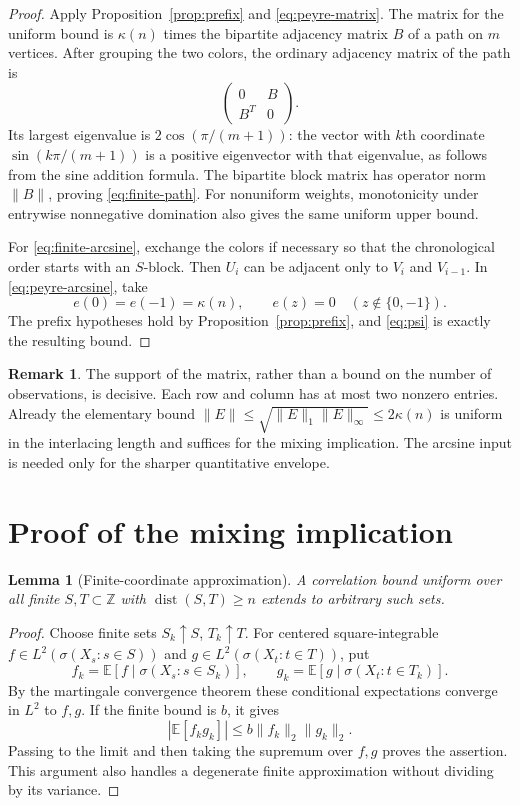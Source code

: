 \documentclass[11pt]{amsart}
\numberwithin{equation}{section}
\newtheorem{lemma}[theorem]{Lemma}
\theoremstyle{definition}
\newtheorem{remark}[theorem]{Remark}
\newcommand{\EE}{\mathbb E}
\newcommand{\ZZ}{\mathbb Z}
\newcommand{\dist}{\operatorname{dist}}
\begin{document}
\begin{proof}
Apply Proposition~\ref{prop:prefix} and \eqref{eq:peyre-matrix}. The matrix for the uniform bound is $\kappa(n)$ times the bipartite adjacency matrix $B$ of a path on $m$ vertices. After grouping the two colors, the ordinary adjacency matrix of the path is
\[
\begin{pmatrix}0&B\\ B^T&0\end{pmatrix}.
\]
Its largest eigenvalue is $2\cos(\pi/(m+1))$: the vector with $k$th coordinate $\sin(k\pi/(m+1))$ is a positive eigenvector with that eigenvalue, as follows from the sine addition formula. The bipartite block matrix has operator norm $\|B\|$, proving \eqref{eq:finite-path}. For nonuniform weights, monotonicity under entrywise nonnegative domination also gives the same uniform upper bound.

For \eqref{eq:finite-arcsine}, exchange the colors if necessary so that the chronological order starts with an $S$-block. Then $U_i$ can be adjacent only to $V_i$ and $V_{i-1}$. In \eqref{eq:peyre-arcsine}, take
\[
e(0)=e(-1)=\kappa(n),\qquad e(z)=0\quad(z\notin\{0,-1\}).
\]
The prefix hypotheses hold by Proposition~\ref{prop:prefix}, and \eqref{eq:psi} is exactly the resulting bound.
\end{proof}

\begin{remark}
The support of the matrix, rather than a bound on the number of observations, is decisive. Each row and column has at most two nonzero entries. Already the elementary bound $\|E\|\le\sqrt{\|E\|_1\|E\|_\infty}\le2\kappa(n)$ is uniform in the interlacing length and suffices for the mixing implication. The arcsine input is needed only for the sharper quantitative envelope.
\end{remark}

\section{Proof of the mixing implication}\label{sec:proof-main}

\begin{lemma}[Finite-coordinate approximation]\label{lem:finite-approx}
A correlation bound uniform over all finite $S,T\subset\ZZ$ with $\dist(S,T)\ge n$ extends to arbitrary such sets.
\end{lemma}

\begin{proof}
Choose finite sets $S_k\uparrow S$, $T_k\uparrow T$. For centered square-integrable $f\in L^2(\sigma(X_s:s\in S))$ and $g\in L^2(\sigma(X_t:t\in T))$, put
\[
f_k=\EE[f\mid\sigma(X_s:s\in S_k)],\qquad
g_k=\EE[g\mid\sigma(X_t:t\in T_k)].
\]
By the martingale convergence theorem these conditional expectations converge in $L^2$ to $f,g$. If the finite bound is $b$, it gives
\[
|\EE[f_kg_k]|\le b\|f_k\|_2\|g_k\|_2.
\]
Passing to the limit and then taking the supremum over $f,g$ proves the assertion. This argument also handles a degenerate finite approximation without dividing by its variance.
\end{proof}
\end{document}
